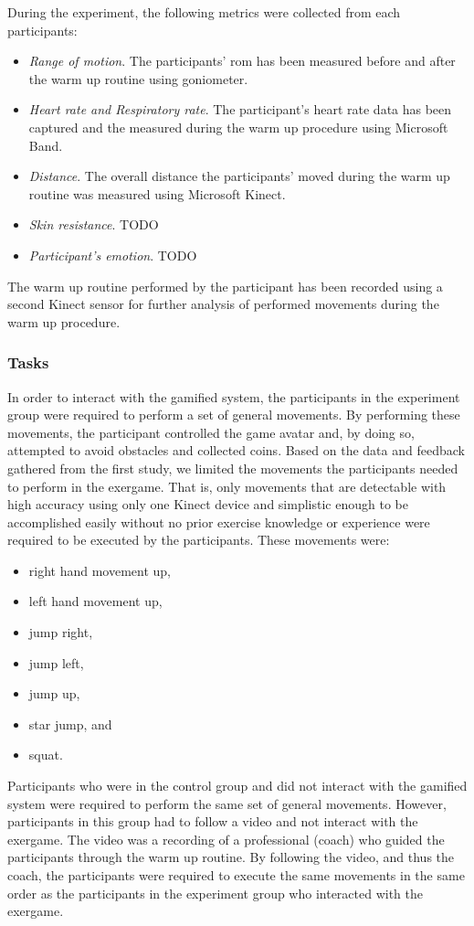 During the experiment, the following metrics were collected from each participants:
\begin{itemize}
\item \textit{Range of motion}. The participants' \acrshort{rom} has been measured before and after the warm up routine using goniometer.
\item \textit{Heart rate and Respiratory rate}. The participant's heart rate data has been captured and the measured during the warm up procedure using Microsoft Band.
\item \textit{Distance}. The overall distance the participants' moved during the warm up routine was measured using Microsoft Kinect. 
\item \textit{Skin resistance}. TODO
\item \textit{Participant's emotion}. TODO
\end{itemize}
The warm up routine performed by the participant has been recorded using a second Kinect sensor for further analysis of performed movements during the warm up procedure.
\subsubsection{Tasks}
In order to interact with the gamified system, the participants in the experiment group were required to perform a set of general movements. By performing these movements, the participant controlled the game avatar and, by doing so, attempted to avoid obstacles and collected coins. Based on the data and feedback gathered from the first study, we limited the movements the participants needed to perform in the exergame. That is, only movements that are detectable with high accuracy using only one Kinect device and simplistic enough to be accomplished easily without no prior exercise knowledge or experience were required to be executed by the participants. These movements were: 
\begin{itemize}
\item right hand movement up,
\item left hand movement up,
\item jump right,
\item jump left,
\item jump up, 
\item star jump, and
\item squat.
\end{itemize}
Participants who were in the control group and did not interact with the gamified system were required to perform the same set of general movements. However, participants in this group had to follow a video and not interact with the exergame. The video was a recording of a professional (coach) who guided the participants through the warm up routine. By following the video, and thus the coach, the participants were required to execute the same movements in the same order as the participants in the experiment group who interacted with the exergame.

